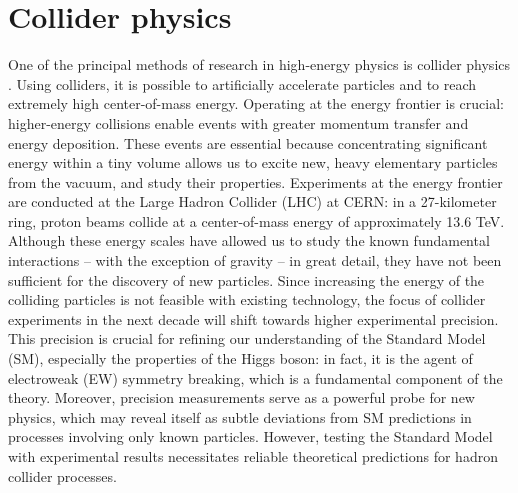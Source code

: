 \documentclass[a4paper, 12pt]{book}
\begin{document}
\section{Collider physics}
One of the principal methods of research in high-energy physics is collider physics \cite{ellis}. Using colliders, it is possible to artificially accelerate particles and to reach extremely high center-of-mass energy. Operating at the energy frontier is crucial: higher-energy collisions enable events with greater momentum transfer and energy deposition. These events are essential because concentrating significant energy within a tiny volume allows us to excite new, heavy elementary particles from the vacuum, and study their properties. Experiments at the energy frontier are conducted at the Large Hadron Collider (LHC) at CERN: in a 27-kilometer ring, proton beams collide at a center-of-mass energy of approximately 13.6 TeV. Although these energy scales have allowed us to study the known fundamental interactions – with the exception of gravity – in great detail, they have not been sufficient for the discovery of new particles.  Since increasing the energy of the colliding particles is not feasible with existing technology, the focus of collider experiments in the next decade will shift towards higher experimental precision. This precision is crucial for refining our understanding of the Standard Model (SM), especially the properties of the Higgs boson: in fact, it is the agent of electroweak (EW) symmetry breaking, which is a fundamental component of the theory. Moreover, precision measurements serve as a powerful probe for new physics, which may reveal itself as subtle deviations from SM predictions in processes involving only known particles.  However, testing the Standard Model with experimental results necessitates reliable theoretical predictions for hadron collider processes.
\end{document}
